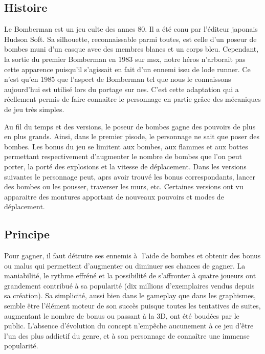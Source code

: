 
\subsection{Histoire}

Le Bomberman est un jeu culte des annes 80. Il a été conu par l'éditeur japonais Hudson Soft. Sa silhouette, reconnaissable parmi toutes, est celle d'un poseur de bombes muni d'un casque avec des membres blancs et un corps bleu. Cependant,  la sortie du premier Bomberman en 1983 sur \gls{msx}, notre héros n'arborait pas cette apparence puisqu'il s'agissait en fait d'un ennemi issu de \gls{lode runner}. Ce n'est qu'en 1985 que l'aspect de Bomberman tel que nous le connaissons aujourd'hui est utilisé lors du portage sur \gls{nes}. C'est cette adaptation qui a réellement permis de faire connaitre le personnage en partie grâce  des mécaniques de jeu très simples.

Au fil du temps et des versions, le poseur de bombes gagne des pouvoirs de plus en plus grands. Ainsi, dans le premier pisode, le personnage ne sait que poser des bombes. Les bonus du jeu se limitent aux bombes, aux flammes et aux bottes permettant respectivement d'augmenter le nombre de bombes que l'on peut porter, la porté des explosions et la vitesse de déplacement. Dans les versions suivantes le personnage peut, aprs avoir trouvé les bonus correspondants, lancer des bombes ou les pousser, traverser les murs, etc. Certaines versions ont vu apparaitre des montures apportant de nouveaux pouvoirs et modes de déplacement.


\subsection{Principe}
Pour gagner, il faut détruire ses ennemis à  l'aide de bombes et obtenir des bonus ou malus qui permettent d'augmenter ou diminuer ses chances de gagner. La maniabilité, le rythme effréné et la possibilité de s’affronter à quatre joueurs ont grandement contribué à sa popularité (dix millions d’exemplaires vendus depuis sa création). Sa simplicité, aussi bien dans le gameplay que dans les graphismes, semble être l’élément moteur de son succès puisque toutes les tentatives de suites, augmentant le nombre de bonus ou passant à la 3D, ont été boudées par le public. L’absence d’évolution du concept n’empêche aucunement à ce jeu d’être l’un des plus addictif du genre, et à son personnage de connaître une immense popularité. 
